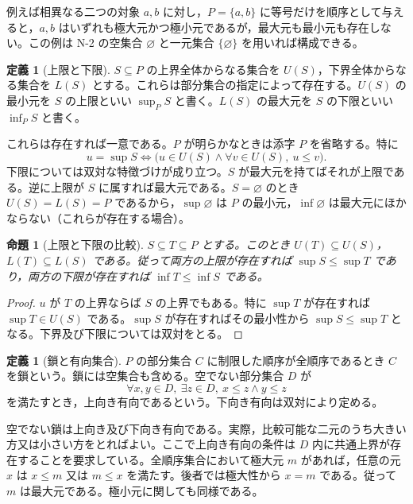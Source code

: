 \documentclass[a5paper,10pt,dvipdfmx]{jsarticle}
\theoremstyle{definition}
\newtheorem{defn}[ruledef]{定義}
\theoremstyle{plain}
\newtheorem{prop}[ruledef]{命題}
\newcommand{\iffc}{\Longleftrightarrow}
\begin{document}
例えば相異なる二つの対象 $a,b$ に対し，$P=\{a,b\}$ に等号だけを順序として与えると，$a,b$ はいずれも極大元かつ極小元であるが，最大元も最小元も存在しない。この例は N-2 の空集合 $\varnothing$ と一元集合 $\{\varnothing\}$ を用いれば構成できる。
\begin{defn}[上限と下限]\label{k73}
$S\subseteq P$ の上界全体からなる集合を $U(S)$，下界全体からなる集合を $L(S)$ とする。これらは部分集合の指定によって存在する。$U(S)$ の最小元を $S$ の上限といい $\sup_P S$ と書く。$L(S)$ の最大元を $S$ の下限といい $\inf_P S$ と書く。
\end{defn}
これらは存在すれば一意である。$P$ が明らかなときは添字 $P$ を省略する。特に
\[
 u=\sup S\iffc
 \bigl(u\in U(S)\land\forall v\in U(S),\ u\leq v\bigr).
\]
下限については双対な特徴づけが成り立つ。$S$ が最大元を持てばそれが上限である。逆に上限が $S$ に属すれば最大元である。$S=\varnothing$ のとき $U(S)=L(S)=P$ であるから，$\sup\varnothing$ は $P$ の最小元，$\inf\varnothing$ は最大元にほかならない（これらが存在する場合）。
\begin{prop}[上限と下限の比較]\label{k74}
$S\subseteq T\subseteq P$ とする。このとき $U(T)\subseteq U(S)$，$L(T)\subseteq L(S)$ である。従って両方の上限が存在すれば $\sup S\leq\sup T$ であり，両方の下限が存在すれば $\inf T\leq\inf S$ である。
\end{prop}
\begin{proof}
$u$ が $T$ の上界ならば $S$ の上界でもある。特に $\sup T$ が存在すれば $\sup T\in U(S)$ である。$\sup S$ が存在すればその最小性から $\sup S\leq\sup T$ となる。下界及び下限については双対をとる。
\end{proof}
\begin{defn}[鎖と有向集合]\label{k75}
$P$ の部分集合 $C$ に制限した順序が全順序であるとき $C$ を鎖という。鎖には空集合も含める。空でない部分集合 $D$ が
\[
 \forall x,y\in D,\ \exists z\in D,\ x\leq z\land y\leq z
\]
を満たすとき，上向き有向であるという。下向き有向は双対により定める。
\end{defn}
空でない鎖は上向き及び下向き有向である。実際，比較可能な二元のうち大きい方又は小さい方をとればよい。ここで上向き有向の条件は $D$ 内に共通上界が存在することを要求している。全順序集合において極大元 $m$ があれば，任意の元 $x$ は $x\leq m$ 又は $m\leq x$ を満たす。後者では極大性から $x=m$ である。従って $m$ は最大元である。極小元に関しても同様である。
\end{document}
